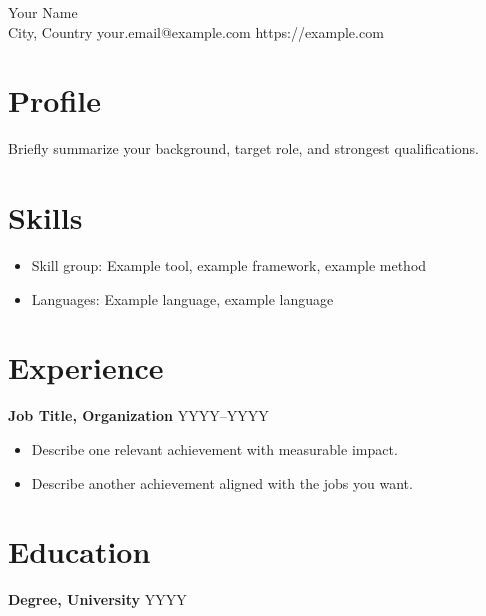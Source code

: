 \documentclass[11pt]{article}
\begin{document}
\begin{center}
{\LARGE Your Name}\\
City, Country \quad your.email@example.com \quad https://example.com
\end{center}

\section*{Profile}
Briefly summarize your background, target role, and strongest qualifications.

\section*{Skills}
\begin{itemize}[leftmargin=*]
  \item Skill group: Example tool, example framework, example method
  \item Languages: Example language, example language
\end{itemize}

\section*{Experience}
\textbf{Job Title, Organization} \hfill YYYY--YYYY
\begin{itemize}[leftmargin=*]
  \item Describe one relevant achievement with measurable impact.
  \item Describe another achievement aligned with the jobs you want.
\end{itemize}

\section*{Education}
\textbf{Degree, University} \hfill YYYY
\end{document}
